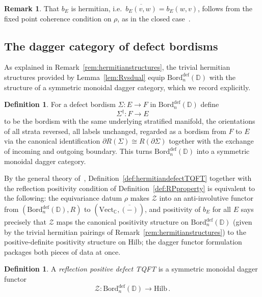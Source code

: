\documentclass[11pt]{article}
\theoremstyle{definition}
\newtheorem{definition}[theorem]{Definition}
\newtheorem{remark}[theorem]{Remark}
\newcommand{\cZ}{\mathcal{Z}}
\newcommand{\bC}{\mathbb{C}}
\newcommand{\bD}{\mathbb{D}}
\newcommand{\Bord}{\mathrm{Bord}}
\newcommand{\Hilb}{\mathrm{Hilb}}
\newcommand{\Vect}{\mathrm{Vect}}
\newcommand{\dg}{\dagger}
\begin{document}
\begin{remark}
\label{rem:hermiticityofb}
That $b_E$ is hermitian, i.e.\ $\overline{b_E(v,w)} = b_E(w,v)$, follows from the fixed point coherence condition on $\rho$, as in the closed case~\cite{FH16,Ste23}.
\end{remark}

\subsection{The dagger category of defect bordisms}
\label{sec:daggerdefbordcat}
As explained in Remark~\ref{rem:hermitianstructures}, the trivial hermitian structures provided by Lemma~\ref{lem:Rvsdual} equip $\Bord_n^{\textrm{def}}(\bD)$ with the structure of a symmetric monoidal dagger category, which we record explicitly.
\begin{definition}
\label{def:daggerstructure}
For a defect bordism $\Sigma \colon E \to F$ in $\Bord_n^{\textrm{def}}(\bD)$ define
\begin{equation}
  \Sigma^\dg \colon F \longrightarrow E
\end{equation}
to be the bordism with the same underlying stratified manifold, the orientations of all strata reversed, all labels unchanged, regarded as a bordism from $F$ to $E$ via the canonical identification $\partial R(\Sigma) \cong R(\partial \Sigma)$ together with the exchange of incoming and outgoing boundary. This turns $\Bord_n^{\textrm{def}}(\bD)$ into a symmetric monoidal dagger category. 
\end{definition}

By the general theory of~\cite[Thm.~2.3.41, \S\S2.4, 5.2]{Ste23}, Definition~\ref{def:hermitiandefectTQFT} together with the reflection positivity condition of Definition~\ref{def:RPproperty} is equivalent to the following: the equivariance datum $\rho$ makes $\cZ$ into an anti-involutive functor from $(\Bord_n^{\textrm{def}}(\bD), R)$ to $(\Vect_\bC, \overline{(-)})$, and positivity of $b_E$ for all $E$ says precisely that $\cZ$ maps the canonical positivity structure on $\Bord_n^{\textrm{def}}(\bD)$ (given by the trivial hermitian pairings of Remark~\ref{rem:hermitianstructures}) to the positive-definite positivity structure on $\Hilb$; the dagger functor formulation packages both pieces of data at once.

\begin{definition}
\label{def:RPdefectTQFT}
A \emph{reflection positive defect TQFT} is a symmetric monoidal dagger functor
\begin{equation}
  \cZ \colon \Bord_n^{\textrm{def}}(\bD) \longrightarrow \Hilb \, .
\end{equation}
\end{definition}
\end{document}

